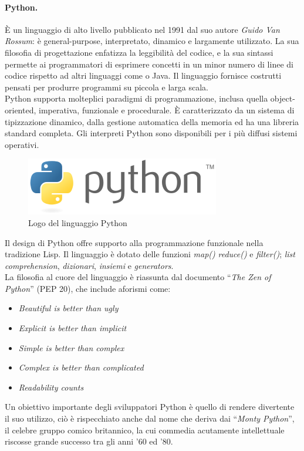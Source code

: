 \paragraph{Python.} È un linguaggio di alto livello pubblicato nel 1991 dal suo autore \textit{Guido Van Rossum}: è general-purpose, interpretato, dinamico e largamente utilizzato. La sua filosofia di progettazione enfatizza la leggibilità del codice, e la sua sintassi permette ai programmatori di esprimere concetti in un minor numero di linee di codice rispetto ad altri linguaggi come \CC \space o Java. Il linguaggio fornisce costrutti pensati per produrre programmi su piccola e larga scala.\\
Python supporta molteplici paradigmi di programmazione, inclusa quella object-oriented, imperativa, funzionale e procedurale. È caratterizzato da un sistema di tipizzazione dinamico, dalla gestione automatica della memoria ed ha una libreria standard completa. Gli interpreti Python sono disponibili per i più diffusi sistemi operativi.
\begin{figure}[h!]
	\centering
	\includegraphics[scale=.4]{img/Python_logo.png}
	\caption{Logo del linguaggio Python}
	\label{img:python}
\end{figure}
Il design di Python offre supporto alla programmazione funzionale nella tradizione Lisp. Il linguaggio è dotato delle funzioni \textit{map()} \textit{reduce()} e \textit{filter()}; \textit{list comprehension}, \textit{dizionari}, \textit{insiemi} e \textit{generators}.\\
La filosofia al cuore del linguaggio è riassunta dal documento ``\textit{The Zen of Python}'' (PEP 20), che include aforismi come:
\begin{itemize}
	\item \textit{Beautiful is better than ugly}
	\item \textit{Explicit is better than implicit}
	\item \textit{Simple is better than complex}
	\item \textit{Complex is better than complicated}
	\item \textit{Readability counts}
\end{itemize}
Un obiettivo importante degli sviluppatori Python è quello di rendere divertente il suo utilizzo, ciò è rispecchiato anche dal nome che deriva dai ``\textit{Monty Python}'', il celebre gruppo comico britannico, la cui commedia acutamente intellettuale riscosse grande successo tra gli anni '60 ed '80.
